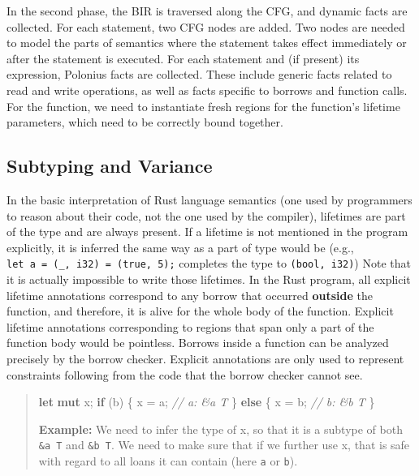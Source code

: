 \documentclass[
  11pt,
  twoside,symmetric]{report}
\newenvironment{Shaded}{}{}
\newcommand{\CommentTok}[1]{\textit{#1}}
\newcommand{\ControlFlowTok}[1]{\textbf{#1}}
\newcommand{\KeywordTok}[1]{\textbf{#1}}
\newcommand{\NormalTok}[1]{#1}
\newcommand{\OperatorTok}[1]{#1}
\begin{document}
In the second phase, the BIR is traversed along the CFG, and dynamic
facts are collected. For each statement, two CFG nodes are added. Two
nodes are needed to model the parts of semantics where the statement
takes effect immediately or after the statement is executed. For each
statement and (if present) its expression, Polonius facts are collected.
These include generic facts related to read and write operations, as
well as facts specific to borrows and function calls. For the function,
we need to instantiate fresh regions for the function's lifetime
parameters, which need to be correctly bound together.

\subsection{Subtyping and Variance}\label{subtyping-and-variance}

In the basic interpretation of Rust language semantics (one used by
programmers to reason about their code, not the one used by the
compiler), lifetimes are part of the type and are always present. If a
lifetime is not mentioned in the program explicitly, it is inferred the
same way as a part of type would be (e.g.,
\texttt{let\ a\ =\ (\_,\ i32)\ =\ (true,\ 5);} completes the type to
\texttt{(bool,\ i32)}) Note that it is actually impossible to write
those lifetimes. In the Rust program, all explicit lifetime annotations
correspond to any borrow that occurred \textbf{outside} the function,
and therefore, it is alive for the whole body of the function. Explicit
lifetime annotations corresponding to regions that span only a part of
the function body would be pointless. Borrows inside a function can be
analyzed precisely by the borrow checker. Explicit annotations are only
used to represent constraints following from the code that the borrow
checker cannot see.

\begin{quote}
\begin{Shaded}
\begin{Highlighting}[]
 \KeywordTok{let} \KeywordTok{mut}\NormalTok{ x}\OperatorTok{;}
 \ControlFlowTok{if}\NormalTok{ (b) }\OperatorTok{\{}
\NormalTok{     x }\OperatorTok{=}\NormalTok{ a}\OperatorTok{;} \CommentTok{// a: \&\textquotesingle{}a T}
 \OperatorTok{\}} \ControlFlowTok{else} \OperatorTok{\{}
\NormalTok{     x }\OperatorTok{=}\NormalTok{ b}\OperatorTok{;} \CommentTok{// b: \&\textquotesingle{}b T}
 \OperatorTok{\}}
\end{Highlighting}
\end{Shaded}

\textbf{Example:} We need to infer the type of x, so that it is a
subtype of both \texttt{\&\textquotesingle{}a\ T} and
\texttt{\&\textquotesingle{}b\ T}. We need to make sure that if we
further use x, that is safe with regard to all loans it can contain
(here \texttt{a} or \texttt{b}).
\end{quote}
\end{document}

